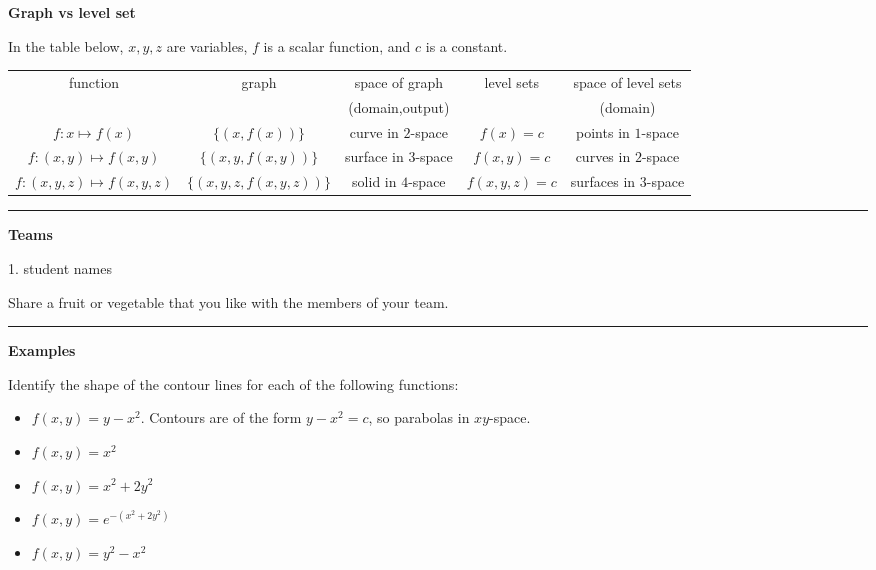 \documentclass[12pt,letterpaper,noanswers]{exam}
\begin{document}
\noindent\textbf{Graph vs level set}

In the table below, $x,y,z$ are variables, $f$ is a scalar function, and $c$ is a constant.

\begin{tabular}{|c|c|c|c|c|}
\hline
function & graph & space of graph & level sets & space of level sets\\
 &  & (domain,output) &  & (domain)\\
\hline
  $f:x\mapsto f(x)$   & $\{(x,f(x))\}$ & curve in $2$-space & $f(x) = c$ & points  in $1$-space\\
   $f:(x,y)\mapsto f(x,y)$  & $\{(x,y,f(x,y))\}$ & surface in $3$-space & $f(x,y) = c$ & curves  in $2$-space\\
   $f:(x,y,z)\mapsto f(x,y,z)$  & $\{(x,y,z,f(x,y,z))\}$ & solid in $4$-space & $f(x,y,z)=c$ & surfaces in $3$-space \\
   \hline
\end{tabular}

\vspace{0.2cm}
\hrule
\vspace{0.2cm}
\eject

\noindent\textbf{Teams}
\begin{multicols}{3}
1.  student names
\end{multicols}

Share a fruit or vegetable that you like with the members of your team.

\vspace{0.2cm}
\hrule
\vspace{0.2cm}

\noindent\textbf{Examples}

 Identify the shape of the contour lines for each of the following functions: 
\begin{itemize}
    \item $f(x,y) = y - x^2$.  Contours are of the form $y - x^2 = c$, so parabolas in $xy$-space.
    \item $f(x,y) = x^2$
    \vspace{0.7cm}
    
    \item $f(x,y) = x^2+2y^2$
       \vspace{0.7cm}
       
        \item $f(x,y) = e^{-(x^2+2y^2)}$
       \vspace{0.7cm}
       
    \item $f(x,y) = y^2 - x^2$
       \vspace{0.7cm}
       
\end{itemize}
 
\end{document}
